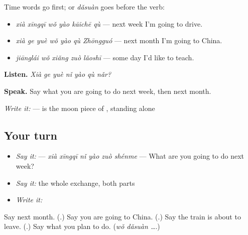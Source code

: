 \begin{grammarlens}[title={What you've built — next week, next month, some day}]
Time words go first;  or \emph{dǎsuàn} goes before the verb:

\begin{itemize}
\raggedright
  \item \textbf{} \emph{xià xīngqī wǒ yào kāichē qù} — next week I'm going to drive.
  \item \textbf{} \emph{xià ge yuè wǒ yào qù Zhōngguó} — next month I'm going to China.
  \item \emph{jiānglái wǒ xiǎng zuò lǎoshī} — some day I'd like to teach.
\end{itemize}

\textbf{Listen.} \emph{Xià ge yuè nǐ yào qù nǎr?}

\textbf{Speak.} Say what you are going to do next week, then next month.

\emph{Write it:}  —  is the moon piece of , standing alone
\end{grammarlens}

\subsection*{Your turn}
\begin{itemize}
\raggedright
  \item \emph{Say it:}  — \emph{xià xīngqī nǐ yào zuò shénme} — What are you going to do next week?
  \item \emph{Say it:} the whole exchange, both parts
  \item \emph{Write it:} 
\end{itemize}

\begin{tcolorbox}[breakable,colback=teal!4,colframe=teal!35!black,title={Before you move on}]
Say next month. (\textbf{}.) Say you are going to China. (\textbf{}.) Say the train is about to leave. (\textbf{}.) Say what you plan to do. (\emph{wǒ dǎsuàn …}.)
\end{tcolorbox}
